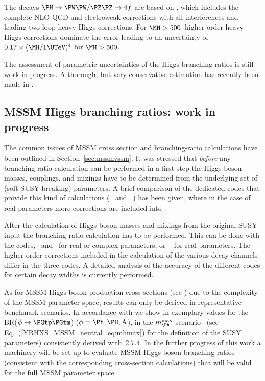 The decays $\PH \to \PW\PW/\PZ\PZ\to4f$ are based on \Prophecy, which
includes the complete NLO QCD and electroweak corrections with all
interferences and leading two-loop heavy-Higgs corrections.  For $\MH >
500$\UGeV\ higher-order heavy-Higgs corrections dominate the error
leading to an uncertainty of $0.17\times(\MH/1\UTeV)^4$ for $\MH >
500$\UGeV.

The assessment of parametric uncertainties of the Higgs branching ratios is still
work in progress. A thorough, but very conservative estimation has recently
been made in .


\subsection{MSSM Higgs branching ratios: work in progress}
\label{sec:MSSM-BR}
\providecommand{\PA}{\mathrm{A}}
\providecommand{\MA}{M_{\PA}}
\newcommand{\tb}{\tan\beta}
\newcommand{\order}[1]{\ensuremath{{\cal O}(#1)}}
\newcommand{\mhmax}{\ensuremath{m_h^{\rm max}}}

The common issues of MSSM cross section and branching-ratio calculations
have been outlined in Section~\ref{sec:mssmvssm}.
It was stressed that {\em before} any branching-ratio calculation can be
performed in a first step the Higgs-boson masses, couplings, and mixings
have to be determined from the underlying set of (soft SUSY-breaking)
parameters. A brief comparison of the dedicated codes that provide this kind of
calculations
(\FeynHiggs~\cite{Heinemeyer:1998yj,Heinemeyer:1998np,Degrassi:2002fi,Frank:2006yh}
and \CPsuperH~\cite{Lee:2003nta,Lee:2007gn}) has been given, where in
the case of real parameters more corrections are included into
\FeynHiggs.

After the calculation of Higgs-boson masses and mixings from the
original SUSY input the branching-ratio calculation has to be
performed.  This can be done with the codes, \CPsuperH\ and
\FeynHiggs\ for real or complex parameters, or
\HDECAY~\cite{Djouadi:1997yw,Spira:1997dg,hdecay2} for real
parameters. The higher-order corrections included
in the calculation of the various decay channels differ in the three
codes. A detailed analysis of the accuracy of the different codes for
certain decay widths is currently performed.

As for MSSM Higgs-boson production cross sections (see
) due to the
complexity of the MSSM parameter space, results can only be derived
in representative benchmark scenarios. In accordance with
we show in  exemplary values for the
BR($\phi \to \PGtp\PGtm$) ($\phi = \Ph, \PH, \PA$),
in the $m_{\Ph}^{\rm max}$ scenario~\cite{Carena:2002qg}
(see Eq.~(\ref{YRHXS_MSSM_neutral_eq:mhmax}) for the definition of the SUSY
parameters) consistently derived
with \FeynHiggs\,2.7.4. In the further progress of this work a machinery will
be set up to evaluate MSSM Higgs-boson branching ratios (consistent with the
corresponding cross-section calculations) that will be valid for the full
MSSM parameter space.


